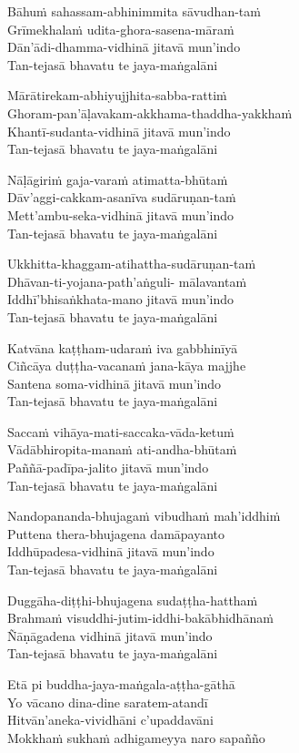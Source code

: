 \begin{paritta}
Bāhuṁ sahassam-abhinimmita sāvudhan-taṁ\\
Grīmekhalaṁ udita-ghora-sasena-māraṁ\\
Dān'ādi-dhamma-vidhinā jitavā mun'indo\\
Tan-tejasā bhavatu te jaya-maṅgalāni

Mārātirekam-abhiyujjhita-sabba-rattiṁ\\
Ghoram-pan'āḷavakam-akkhama-thaddha-yakkhaṁ\\
Khantī-sudanta-vidhinā jitavā mun'indo\\
Tan-tejasā bhavatu te jaya-maṅgalāni

Nāḷāgiriṁ gaja-varaṁ atimatta-bhūtaṁ\\
Dāv'aggi-cakkam-asanīva sudāruṇan-taṁ\\
Mett'ambu-seka-vidhinā jitavā mun'indo\\
Tan-tejasā bhavatu te jaya-maṅgalāni

Ukkhitta-khaggam-atihattha-sudāruṇan-taṁ\\
Dhāvan-ti-yojana-path'aṅguli- mālavantaṁ\\
Iddhī'bhisaṅkhata-mano jitavā mun'indo\\
Tan-tejasā bhavatu te jaya-maṅgalāni

\clearpage

Katvāna kaṭṭham-udaraṁ iva gabbhinīyā\\
Ciñcāya duṭṭha-vacanaṁ jana-kāya majjhe\\
Santena soma-vidhinā jitavā mun'indo\\
Tan-tejasā bhavatu te jaya-maṅgalāni

Saccaṁ vihāya-mati-saccaka-vāda-ketuṁ\\
Vādābhiropita-manaṁ ati-andha-bhūtaṁ\\
Paññā-padīpa-jalito jitavā mun'indo\\
Tan-tejasā bhavatu te jaya-maṅgalāni

Nandopananda-bhujagaṁ vibudhaṁ mah'iddhiṁ\\
Puttena thera-bhujagena damāpayanto\\
Iddhūpadesa-vidhinā jitavā mun'indo\\
Tan-tejasā bhavatu te jaya-maṅgalāni

Duggāha-diṭṭhi-bhujagena sudaṭṭha-hatthaṁ\\
Brahmaṁ visuddhi-jutim-iddhi-bakābhidhānaṁ\\
Ñāṇāgadena vidhinā jitavā mun'indo\\
Tan-tejasā bhavatu te jaya-maṅgalāni

Etā pi buddha-jaya-maṅgala-aṭṭha-gāthā\\
Yo vācano dina-dine saratem-atandī\\
Hitvān'aneka-vividhāni c'upaddavāni\\
Mokkhaṁ sukhaṁ adhigameyya naro sapañño
\end{paritta}


